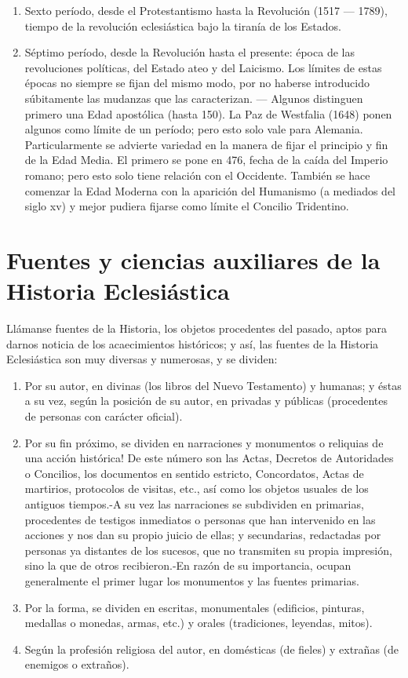 \raggedbottom{} \documentclass[12pt, a4paper, openany]{book} %
\begin{document}
\begin{enumerate}
\begin{enumerate}
          \item Sexto período, desde el Protestantismo hasta la Revolución (1517 --- 1789), tiempo de la revolución eclesiástica bajo la tiranía de los Estados.
          \item Séptimo período, desde la Revolución hasta el presente: época de las revoluciones políticas, del Estado ateo y del Laicismo. Los límites de estas épocas no siempre se fijan del mismo modo, por no haberse introducido súbitamente las mudanzas que las caracterizan. --- Algunos distinguen primero una Edad apostólica (hasta 150). La Paz de Westfalia (1648) ponen algunos como límite de un período; pero esto solo vale para Alemania. Particularmente se advierte variedad en la manera de fijar el principio y fin de la Edad Media. El primero se pone en 476, fecha de la caída del Imperio romano; pero esto solo tiene relación con el Occidente. También se hace comenzar la Edad Moderna con la aparición del Humanismo (a mediados del siglo xv) y mejor pudiera fijarse como límite el Concilio Tridentino.
        \end{enumerate}

\end{enumerate}
\section{Fuentes y ciencias auxiliares de la Historia Eclesiástica}
Llámanse fuentes de la Historia, los objetos procedentes del pasado, aptos para darnos noticia de los acaecimientos históricos; y
así, las fuentes de la Historia Eclesiástica son muy diversas y numerosas, y se dividen:
\begin{enumerate}
  \item Por su autor, en divinas (los libros del Nuevo Testamento) y humanas; y éstas a su vez, según la posición de su autor, en privadas y públicas (procedentes de personas con carácter oficial).
  \item Por su fin próximo, se dividen en narraciones y monumentos o reliquias de una acción histórica! De este número son las Actas, Decretos de Autoridades o Concilios, los documentos en sentido estricto, Concordatos, Actas de martirios, protocolos de visitas, etc., así como los objetos usuales de los antiguos tiempos.-A su vez las narraciones se subdividen en primarias, procedentes de testigos inmediatos o personas que han intervenido en las acciones y nos dan su propio juicio de ellas; y secundarias, redactadas por personas ya distantes de los sucesos, que no transmiten su propia impresión, sino la que de otros recibieron.-En razón de su importancia, ocupan generalmente el primer lugar los monumentos y las fuentes primarias.
  \item Por la forma, se dividen en escritas, monumentales (edificios, pinturas, medallas o monedas, armas, etc.) y orales (tradiciones, leyendas, mitos).
  \item Según la profesión religiosa del autor, en domésticas (de fieles) y extrañas (de enemigos o extraños).
\end{enumerate}
\end{document}
